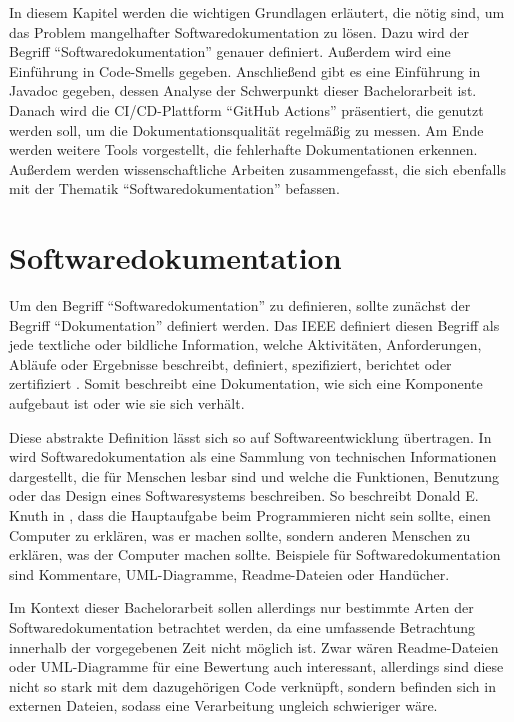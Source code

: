\label{sec:background}
In diesem Kapitel werden die wichtigen Grundlagen erläutert, die nötig sind, um das Problem mangelhafter Softwaredokumentation zu lösen.  Dazu  wird der Begriff \enquote{Softwaredokumentation} genauer definiert. Außerdem wird eine Einführung in Code-Smells gegeben.  Anschließend gibt es eine Einführung in Javadoc gegeben, dessen Analyse der Schwerpunkt dieser Bachelorarbeit ist. Danach wird die \ac{CI/CD}-Plattform \enquote{GitHub Actions} präsentiert, die genutzt werden soll, um die Dokumentationsqualität regelmäßig zu messen. Am Ende werden weitere Tools vorgestellt, die fehlerhafte Dokumentationen erkennen. Außerdem werden wissenschaftliche Arbeiten zusammengefasst, die sich ebenfalls mit der Thematik \enquote{Softwaredokumentation} befassen. 
 

\section{Softwaredokumentation}\label{chapter:documentation}
Um den Begriff \enquote{Softwaredokumentation} zu definieren, sollte zunächst der Begriff \enquote{Dokumentation} definiert werden. Das IEEE  definiert diesen Begriff als jede textliche oder bildliche Information, welche Aktivitäten, Anforderungen, Abläufe oder Ergebnisse beschreibt, definiert, spezifiziert, berichtet oder zertifiziert \cite[S. 28]{IEEEStandardGlossaryofSoftwareEngineeringTerminology}. Somit beschreibt eine Dokumentation, wie sich eine Komponente aufgebaut ist oder wie sie sich verhält.

Diese abstrakte Definition lässt sich so auf Softwareentwicklung übertragen. In \cite[S. 125]{Softwaredocumentationandstandards} wird Softwaredokumentation als eine Sammlung von technischen Informationen dargestellt, die für Menschen lesbar sind und welche die Funktionen, Benutzung oder das Design eines Softwaresystems beschreiben. So beschreibt Donald E. Knuth in \cite[S. 97]{LiterateProgramming}, dass die Hauptaufgabe beim Programmieren nicht sein sollte, einen Computer zu erklären, was er machen sollte, sondern anderen Menschen zu erklären, was der Computer machen sollte. Beispiele für Softwaredokumentation sind Kommentare,  UML-Diagramme, Readme-Dateien oder Handücher.

Im Kontext dieser Bachelorarbeit sollen allerdings nur bestimmte Arten der Softwaredokumentation betrachtet werden, da eine umfassende Betrachtung innerhalb der vorgegebenen Zeit nicht möglich ist.  Zwar wären Readme-Dateien oder UML-Diagramme für eine Bewertung auch interessant, allerdings sind diese nicht so stark mit dem dazugehörigen Code verknüpft, sondern befinden sich in externen Dateien, sodass eine Verarbeitung ungleich schwieriger wäre.

